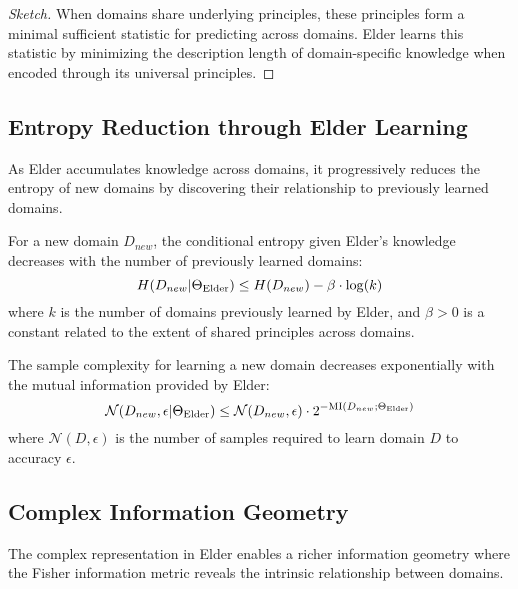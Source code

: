 \begin{proof}[Sketch]
When domains share underlying principles, these principles form a minimal sufficient statistic for predicting across domains. Elder learns this statistic by minimizing the description length of domain-specific knowledge when encoded through its universal principles.
\end{proof}

\subsection{Entropy Reduction through Elder Learning}

As Elder accumulates knowledge across domains, it progressively reduces the entropy of new domains by discovering their relationship to previously learned domains.

\begin{theorem}
For a new domain $D_{new}$, the conditional entropy given Elder's knowledge decreases with the number of previously learned domains:
\begin{equation}
H(D_{new} | \Theta_{\text{Elder}}) \leq H(D_{new}) - \beta \cdot \log(k)
\end{equation}
where $k$ is the number of domains previously learned by Elder, and $\beta > 0$ is a constant related to the extent of shared principles across domains.
\end{theorem}

\begin{corollary}
The sample complexity for learning a new domain decreases exponentially with the mutual information provided by Elder:
\begin{equation}
\mathcal{N}(D_{new}, \epsilon | \Theta_{\text{Elder}}) \leq \mathcal{N}(D_{new}, \epsilon) \cdot 2^{-\text{MI}(D_{new}; \Theta_{\text{Elder}})}
\end{equation}
where $\mathcal{N}(D, \epsilon)$ is the number of samples required to learn domain $D$ to accuracy $\epsilon$.
\end{corollary}

\subsection{Complex Information Geometry}

The complex representation in Elder enables a richer information geometry where the Fisher information metric reveals the intrinsic relationship between domains.

